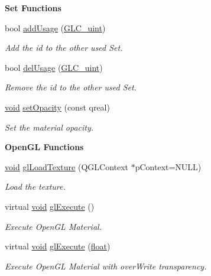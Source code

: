 \begin{Indent}{\bf Set Functions}
\begin{DoxyCompactItemize}
bool \hyperlink{class_g_l_c___material_a2a15a98940fdaf12f579ecdd9fbcc060}{add\-Usage} (\hyperlink{glc__global_8h_abf950976fabed69026558df8e2da6c6b}{G\-L\-C\-\_\-uint})
\begin{DoxyCompactList}\small\item\em Add the id to the other used Set. \end{DoxyCompactList}\item 
bool \hyperlink{class_g_l_c___material_a5a9d983c32b47a5bb921d94d4d8a98f2}{del\-Usage} (\hyperlink{glc__global_8h_abf950976fabed69026558df8e2da6c6b}{G\-L\-C\-\_\-uint})
\begin{DoxyCompactList}\small\item\em Remove the id to the other used Set. \end{DoxyCompactList}\item 
\hyperlink{group___u_a_v_objects_plugin_ga444cf2ff3f0ecbe028adce838d373f5c}{void} \hyperlink{class_g_l_c___material_a9f6345fbe0048a221c37cda9ff98ceb8}{set\-Opacity} (const qreal)
\begin{DoxyCompactList}\small\item\em Set the material opacity. \end{DoxyCompactList}\end{DoxyCompactItemize}
\end{Indent}
\begin{Indent}{\bf Open\-G\-L Functions}\par
\begin{DoxyCompactItemize}
\item 
\hyperlink{group___u_a_v_objects_plugin_ga444cf2ff3f0ecbe028adce838d373f5c}{void} \hyperlink{class_g_l_c___material_a7126ebaceabb751b75269c8cc567b69f}{gl\-Load\-Texture} (Q\-G\-L\-Context $\ast$p\-Context=N\-U\-L\-L)
\begin{DoxyCompactList}\small\item\em Load the texture. \end{DoxyCompactList}\item 
virtual \hyperlink{group___u_a_v_objects_plugin_ga444cf2ff3f0ecbe028adce838d373f5c}{void} \hyperlink{class_g_l_c___material_a360d229e99bf4ee5f2b3880a34b41468}{gl\-Execute} ()
\begin{DoxyCompactList}\small\item\em Execute Open\-G\-L Material. \end{DoxyCompactList}\item 
virtual \hyperlink{group___u_a_v_objects_plugin_ga444cf2ff3f0ecbe028adce838d373f5c}{void} \hyperlink{class_g_l_c___material_aa0d61e56646dfa068ba61e68d07f2509}{gl\-Execute} (\hyperlink{_super_l_u_support_8h_a6a1bb6ed41f44b60e7bd83b0e9945aa7}{float})
\begin{DoxyCompactList}\small\item\em Execute Open\-G\-L Material with over\-Write transparency. \end{DoxyCompactList}\end{DoxyCompactItemize}
\end{Indent}
